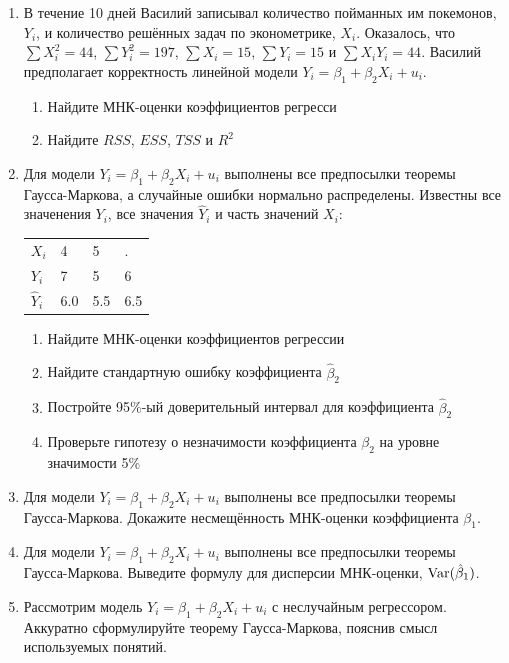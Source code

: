 \documentclass[12pt, a4paper]{article}
\begin{document}
\begin{enumerate}

\item В течение 10 дней Василий записывал количество пойманных им покемонов, $Y_i$, и количество решённых задач по эконометрике, $X_i$. Оказалось, что $\sum X_i^2 = 44$, $\sum Y_i^2 = 197$, $\sum X_i = 15 $, $\sum Y_i = 15$ и $\sum X_i Y_i = 44$. Василий предполагает корректность линейной модели $Y_i = \beta_1 + \beta_2 X_i + u_i$.

\begin{enumerate}
\item Найдите МНК-оценки коэффициентов регресси
\item Найдите $RSS$, $ESS$, $TSS$ и $R^2$
\end{enumerate}

 \item Для модели $Y_i = \beta_1 + \beta_2 X_i + u_i$ выполнены все предпосылки теоремы Гаусса-Маркова, а случайные ошибки нормально распределены. Известны все значенения $Y_i$, все значения $\hat Y_i$ и часть значений $X_i$:

\begin{tabular}{llll}
\toprule
$X_i$      & 4 & 5 & . \\
$Y_i$      & 7 & 5 & 6 \\
$\hat Y_i$ & 6.0 & 5.5 & 6.5 \\
\bottomrule
\end{tabular}

\begin{enumerate}
\item Найдите МНК-оценки коэффициентов регрессии
\item Найдите стандартную ошибку коэффициента $\hat \beta_2$
\item Постройте 95\%-ый доверительный интервал для коэффициента $\hat \beta_2$
\item Проверьте гипотезу о незначимости коэффициента $\beta_2$ на уровне значимости 5\%
\end{enumerate}

 \item Для модели $Y_i = \beta_1 + \beta_2 X_i + u_i$ выполнены все предпосылки теоремы Гаусса-Маркова. Докажите несмещённость МНК-оценки коэффициента $\beta_1$. \item Для модели $Y_i = \beta_1 + \beta_2 X_i + u_i$ выполнены все предпосылки теоремы Гаусса-Маркова. Выведите формулу для дисперсии МНК-оценки, $\operatorname{Var}(\hat{\beta}_1)$.

 \item Рассмотрим модель $Y_i = \beta_1 + \beta_2 X_i + u_i$ с неслучайным регрессором. Аккуратно сформулируйте теорему Гаусса-Маркова, пояснив смысл используемых понятий.

\end{enumerate}
\end{document}
